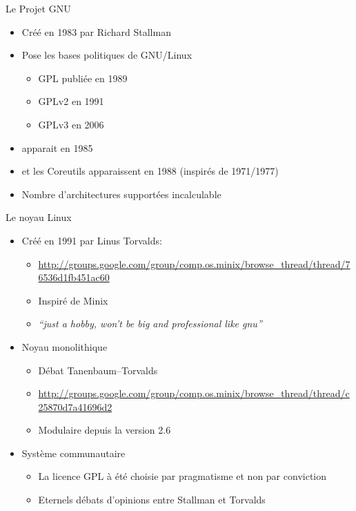 \begin{frame}{Le Projet GNU}
  \begin{itemize}
  \item Créé en 1983 par Richard Stallman
  \item Pose  les bases politiques  de GNU/Linux
    \begin{itemize}
    \item GPL publiée en 1989
    \item GPLv2 en 1991 
    \item GPLv3 en 2006
    \end{itemize}
  \item {} apparait en 1985
  \item {} et les  Coreutils apparaissent en 1988 (inspirés de
     1971/1977)
  \item Nombre d'architectures supportées incalculable
  \end{itemize}
\end{frame}

\begin{frame}{Le noyau Linux}
  \begin{itemize}
  \item Créé en 1991 par Linus Torvalds:
    \begin{itemize} 
    \item \url{http://groups.google.com/group/comp.os.minix/browse_thread/thread/76536d1fb451ac60}
    \item Inspiré de Minix
    \item \emph{``just a hobby, won't be big and professional like gnu''}
    \end{itemize} 
  \item Noyau monolithique
    \begin{itemize} 
    \item Débat Tanenbaum–Torvalds
    \item \url{http://groups.google.com/group/comp.os.minix/browse_thread/thread/c25870d7a41696d2}
    \item Modulaire depuis  la  version  2.6
    \end{itemize} 
  \item Système communautaire
    \begin{itemize} 
    \item La licence GPL à été choisie par pragmatisme et non par conviction
    \item Eternels débats d'opinions entre Stallman et Torvalds
    \end{itemize} 
  \end{itemize}
\end{frame}

